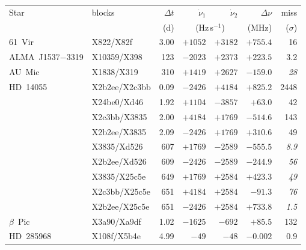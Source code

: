 \begin{tabular}{@{}l@{~}l@{~}r@{~}r@{~}r@{~}r@{~}r@{}}
\hline
Star & blocks & $\Delta t$ & $\dot\nu_1$ & $\dot\nu_2$ & $\Delta\nu$ & miss \\
 & & (d) & \multicolumn{2}{c}{(Hz\,s$^{-1}$)} & (MHz) & ($\sigma$) \\
\hline
61~Vir & X822/X82f & 3.00 & $+1052$ & $+3182$ & $+755.4$ & 16 \\
ALMA~J1537$-$3319 & X10359/X398 & 123 & $-2023$ & $+2373$ & $+223.5$ & 3.2 \\
AU~Mic & X1838/X319 & 310 & $+1419$ & $+2627$ & $-159.0$ & \emph{28} \\
HD~14055 & X2b2ee/X2c3bb & 0.09 & $-2426$ & $+4184$ & $+825.2$ & 2448 \\
 & X24be0/Xd46 & 1.92 & $+1104$ & $-3857$ & $+63.0$ & 42 \\
 & X2c3bb/X3835 & 2.00 & $+4184$ & $+1769$ & $-514.6$ & 143 \\
 & X2b2ee/X3835 & 2.09 & $-2426$ & $+1769$ & $+310.6$ & 49 \\
 & X3835/Xd526 & 607 & $+1769$ & $-2589$ & $-555.5$ & \emph{8.9} \\
 & X2b2ee/Xd526 & 609 & $-2426$ & $-2589$ & $-244.9$ & \emph{56} \\
 & X3835/X25c5e & 649 & $+1769$ & $+2584$ & $+423.3$ & \emph{49} \\
 & X2c3bb/X25c5e & 651 & $+4184$ & $+2584$ & $-91.3$ & \emph{76} \\
 & X2b2ee/X25c5e & 651 & $-2426$ & $+2584$ & $+733.8$ & \emph{1.5} \\
$\beta$~Pic & X3a90/Xa9df & 1.02 & $-1625$ & $-692$ & $+85.5$ & 132 \\
\hline
HD~285968 & X108f/X5b4e & 4.99 & $-49$ & $-48$ & $-0.002$ & 0.9 \\
\hline
\end{tabular}
